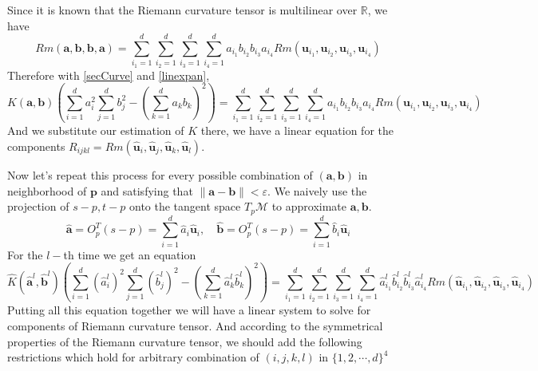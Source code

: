\documentclass{article}
\begin{document}
Since it is known that the Riemann curvature tensor is multilinear over $\mathbb{R}$, we have
\begin{equation}
	Rm(\boldsymbol{a},\boldsymbol{b},\boldsymbol{b},\boldsymbol{a})=\sum_{i_1=1}^d\sum_{i_2=1}^d\sum_{i_3=1}^d\sum_{i_4=1}^da_{i_1}b_{i_2}b_{i_3}a_{i_4}Rm(\boldsymbol{u}_{i_1},\boldsymbol{u}_{i_2},\boldsymbol{u}_{i_3},\boldsymbol{u}_{i_4})
	\label{linexpan}
\end{equation}
Therefore with \ref{secCurve} and \ref{linexpan},
\begin{equation}
	K(\boldsymbol{a},\boldsymbol{b})\left(\sum_{i=1}^da_i^2\sum_{j=1}^db_j^2-(\sum_{k=1}^da_kb_k)^2\right)=\sum_{i_1=1}^d\sum_{i_2=1}^d\sum_{i_3=1}^d\sum_{i_4=1}^da_{i_1}b_{i_2}b_{i_3}a_{i_4}Rm(\boldsymbol{u}_{i_1},\boldsymbol{u}_{i_2},\boldsymbol{u}_{i_3},\boldsymbol{u}_{i_4})
	\label{Maineq}
\end{equation}
And we substitute our estimation of $K$ there, we have a linear equation for the components $R_{ijkl}=Rm(\widehat{\boldsymbol{u}}_i,\widehat{\boldsymbol{u}}_j,\widehat{\boldsymbol{u}}_k,\widehat{\boldsymbol{u}}_l)$.
\par
Now let's repeat this process for every possible combination of $(\boldsymbol{a},\boldsymbol{b})$ in neighborhood of $\boldsymbol{p}$ and satisfying that $\parallel \boldsymbol{a}-\boldsymbol{b} \parallel< \varepsilon$. We naively use the projection of $s-p,t-p$ onto the tangent space $T_p\mathcal{M}$ to approximate $\boldsymbol{a},\boldsymbol{b}$. 
\begin{equation}
	\widehat{\boldsymbol{a}}=O_p^T(s-p)=\sum_{i=1}^d\widehat{a}_i\widehat{\boldsymbol{u}}_i,\quad \widehat{\boldsymbol{b}}=O_p^T(s-p)=\sum_{i=1}^d\widehat{b}_i\widehat{\boldsymbol{u}}_i
	\label{expandabest}
\end{equation}
For the $l-$th time we get an equation
\begin{equation}
	\widehat{K}(\widehat{\boldsymbol{a}}^{l},\widehat{\boldsymbol{b}}^l)\left(\sum_{i=1}^d(\widehat{a}_i^{l})^2\sum_{j=1}^d(\widehat{b}_j^l)^2-(\sum_{k=1}^d\widehat{a}_k^l\widehat{b}_k^l)^2\right)=\sum_{i_1=1}^d\sum_{i_2=1}^d\sum_{i_3=1}^d\sum_{i_4=1}^d\widehat{a}_{i_1}^l\widehat{b}_{i_2}^l\widehat{b}_{i_3}^l\widehat{a}_{i_4}^lRm(\widehat{\boldsymbol{u}}_{i_1},\widehat{\boldsymbol{u}}_{i_2},\widehat{\boldsymbol{u}}_{i_3},\widehat{\boldsymbol{u}}_{i_4})
	\label{Mainesteq}
\end{equation}
Putting all this equation together we will have a linear system to solve for components of Riemann curvature tensor. And according to the symmetrical properties of the Riemann curvature tensor, we should add the following restrictions which hold for arbitrary combination of $(i,j,k,l)$ in $\{1,2,\cdots,d\}^4$
\end{document}
